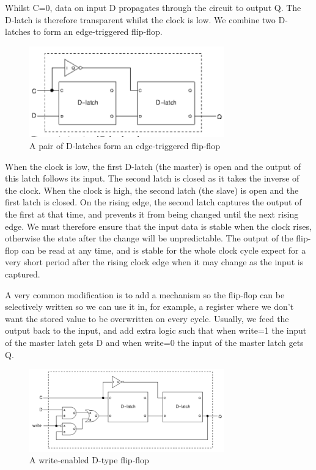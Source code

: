 \documentclass{article}
\begin{document}
	Whilst C=0, data on input D propagates through the circuit to output Q. The D-latch is therefore transparent whilst the clock is low. We combine two D-latches to form an edge-triggered flip-flop.
	
	\begin{figure}[ht]
		\centering
		\includegraphics[width=0.75\textwidth]{edge_triggered_flip_flop}
		\caption{A pair of D-latches form an edge-triggered flip-flop}
		\label{fig:edge triggered flip flop}
	\end{figure}
	
	When the clock is low, the first D-latch (the master) is open and the output of this latch follows its input. The second latch is closed as it takes the inverse of the clock. When the clock is high, the second latch (the slave) is open and the first latch is closed. On the rising edge, the second latch captures the output of the first at that time, and prevents it from being changed until the next rising edge. We must therefore ensure that the input data is stable when the clock rises, otherwise the state after the change will be unpredictable. The output of the flip-flop can be read at any time, and is stable for the whole clock cycle expect for a very short period after the rising clock edge when it may change as the input is captured.
	
	\par 
	A very common modification is to add a mechanism so the flip-flop can be selectively written so we can use it in, for example, a register where we don't want the stored value to be overwritten on every cycle. Usually, we feed the output back to the input, and add extra logic such that when write=1 the input of the master latch gets D and when write=0 the input of the master latch gets Q.
	
	\begin{figure}[ht]
		\centering
		\includegraphics[width=0.75\textwidth]{d_type_flip_flop}
		\caption{A write-enabled D-type flip-flop}
		\label{fig:d type flip flop}
	\end{figure}		
	
\end{document}
